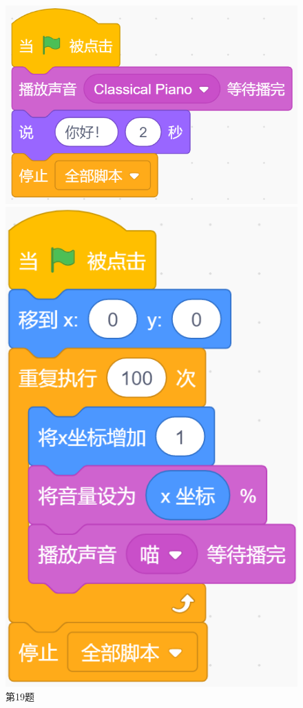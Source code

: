 \documentclass[10pt, a4paper]{article}
\begin{document}
\begin{enumerate}
        \begin{figure}[htbp]
            \centering
            \begin{minipage}[t]{.23\textwidth}
                \centering
                \includegraphics[width=\textwidth]{19.png}
                \caption*{第19题}
            \end{minipage}
            \begin{minipage}[t]{.18\textwidth}
                \centering
                \includegraphics[width=\textwidth]{21.png}

\end{minipage}
\end{figure}
\end{enumerate}
\end{document}
